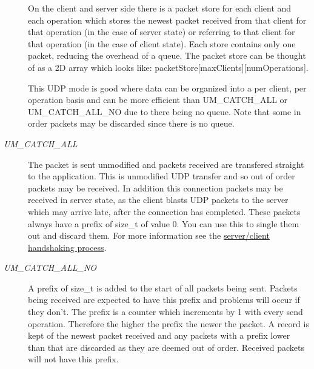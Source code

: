 \begin{Desc}
\begin{description}
\begin{DoxyItemize}
\end{DoxyItemize}

On the client and server side there is a packet store for each client and each operation which stores the newest packet received from that client for that operation (in the case of server state) or referring to that client for that operation (in the case of client state). Each store contains only one packet, reducing the overhead of a queue. The packet store can be thought of as a 2D array which looks like: packetStore\mbox{[}maxClients\mbox{]}\mbox{[}numOperations\mbox{]}.\par
\par


This UDP mode is good where data can be organized into a per client, per operation basis and can be more efficient than UM\_\-CATCH\_\-ALL or UM\_\-CATCH\_\-ALL\_\-NO due to there being no queue. Note that some in order packets may be discarded since there is no queue.\par
\par
 \item[{\em 
\hypertarget{classcl_shared_protocol_a4b0b9c82b8ae4eee78c6308c35afd47ba5315dd28370f0e13b26603c1b0a17c21}{
UM\_\-CATCH\_\-ALL}
\label{classcl_shared_protocol_a4b0b9c82b8ae4eee78c6308c35afd47ba5315dd28370f0e13b26603c1b0a17c21}
}]The packet is sent unmodified and packets received are transfered straight to the application. This is unmodified UDP transfer and so out of order packets may be received. In addition this connection packets may be received in server state, as the client blasts UDP packets to the server which may arrive late, after the connection has completed. These packets always have a prefix of size\_\-t of value 0. You can use this to single them out and discard them. For more information see the \hyperlink{handshake_page}{server/client handshaking process}.\par
\par
 \item[{\em 
\hypertarget{classcl_shared_protocol_a4b0b9c82b8ae4eee78c6308c35afd47ba5780629b78f91735d369000983ce955e}{
UM\_\-CATCH\_\-ALL\_\-NO}
\label{classcl_shared_protocol_a4b0b9c82b8ae4eee78c6308c35afd47ba5780629b78f91735d369000983ce955e}
}]A prefix of size\_\-t is added to the start of all packets being sent. Packets being received are expected to have this prefix and problems will occur if they don't. The prefix is a counter which increments by 1 with every send operation. Therefore the higher the prefix the newer the packet. A record is kept of the newest packet received and any packets with a prefix lower than that are discarded as they are deemed out of order. Received packets will not have this prefix. \par
\par



\end{description}
\end{Desc}
